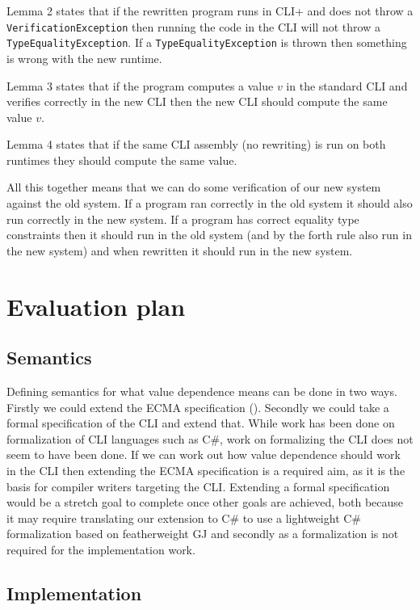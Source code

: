 \documentclass[english]{report}
\begin{document}
Lemma 2 states that if the rewritten program runs in CLI+ and does not throw a
\texttt{VerificationException} then running the code in the CLI will not throw
a \texttt{TypeEqualityException}. If a \texttt{TypeEqualityException} is thrown
then something is wrong with the new runtime.

Lemma 3 states that if the program computes a value $v$ in the standard CLI
and verifies correctly in the new CLI then the new CLI should compute the same
value $v$.

Lemma 4 states that if the same CLI assembly (no rewriting) is run on both
runtimes they should compute the same value.

All this together means that we can do some verification of our new system
against the old system. If a program ran correctly in the old system it should
also run correctly in the new system. If a program has correct equality type
constraints then it should run in the old system (and by the forth rule also
run in the new system) and when rewritten it should run in the new system.


\chapter{Evaluation plan}


\section{Semantics}

Defining semantics for what value dependence means can be done in
two ways. Firstly we could extend the ECMA specification (\cite{ecma-335}).
Secondly we could take a formal specification of the CLI and extend
that. While work has been done on formalization of CLI languages such
as C\#, work on formalizing the CLI does not seem to have been done.
If we can work out how value dependence should work in the CLI then
extending the ECMA specification is a required aim, as it is the basis
for compiler writers targeting the CLI. Extending a formal specification
would be a stretch goal to complete once other goals are achieved,
both because it may require translating our extension to C\# to use
a lightweight C\# formalization based on featherweight GJ and secondly
as a formalization is not required for the implementation work.


\section{Implementation}
\end{document}
